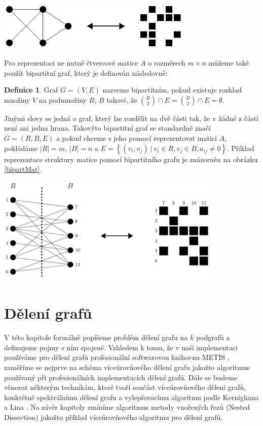 \documentclass[11pt,american,czech,oneside]{book}
\theoremstyle{plain}
\theoremstyle{definition}
\newtheorem{definition}{Definice}
\begin{document}
\bigskip
{
  \centering
  \includegraphics[width=0.7\textwidth]{pictures/matgr.pdf}
}
\bigskip

Pro reprezentaci ne nutně čtvercové matice $A$ o rozměrech $m\times n$ můžeme také použít bipartitní graf, který je definován následovně:

\begin{definition}
  Graf $G=(V,E)$ nazveme bipartitním, pokud existuje rozklad množiny $V$ na podmnožiny $R$, $B$ takové, že ${R \choose 2} \cap E = {B \choose 2} \cap E = \emptyset$.
\end{definition}

Jinými slovy se jedná o graf, který lze rozdělit na dvě části tak, že v žádné z částí není ani jedna hrana. Takovýto bipartitní graf se standardně značí $G=(R,B,E)$ a pokud chceme s jeho pomocí reprezentovat matici $A$, pokládáme $|R|=m$, $|B|=n$ a $E = \left\{(v_i,v_j) \ | \ v_i \in R, v_j \in B, a_{ij} \neq 0 \right\}$. Příklad reprezentace struktury matice pomocí bipartitního grafu je znázorněn na obrázku \ref{bipartMat}.

\bigskip
{
  \centering
  \includegraphics[width=0.8\textwidth]{pictures/bipart_grmat.pdf}
}


\chapter{Dělení grafů}

V této kapitole formálně popíšeme problém dělení grafu na $k$ podgrafů a definujeme pojmy s ním spojené. Vzhledem k tomu, že v naší implementaci používáme pro dělení grafů profesionální softwarovou knihovnu METIS \cite{kary:13}, zaměříme se nejprve na schéma víceúrovňového dělení grafu jakožto algoritmus používaný při profesionálních implementacích dělení grafů. Dále se budeme věnovat některým technikám, které tvoří součást víceúrovňového dělení grafů, konkrétně spektrálnímu dělení grafu a vylepšovacímu algoritmu podle Kernighana a Lina \cite{keli:70}. Na závěr kapitoly zmíníme algoritmus metody vnořených řezů (Nested Dissection) jakožto příklad víceúrovňového algoritmu pro dělení grafů.
\end{document}
